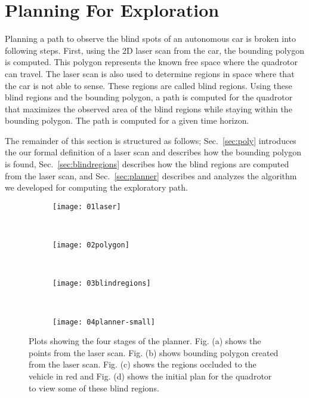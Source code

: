 
\section{Planning For Exploration}

Planning a path to observe the blind spots of an autonomous car is broken into
following steps. First, using the 2D laser scan from the car, the bounding
polygon is computed. This polygon represents the known free space where the
quadrotor can travel. The laser scan is also used to determine regions in space
where that the car is not able to sense. These regions are called blind
regions. Using these blind regions and the bounding polygon, a path is computed
for the quadrotor that maximizes the observed area of the blind regions while
staying within the bounding polygon. The path is computed for a given time
horizon.

The remainder of this section is structured as follows; Sec.~\ref{sec:poly}
introduces the our formal definition of a laser scan and describes how the
bounding polygon is found, Sec.~\ref{sec:blindregions} describes how the blind
regions are computed from the laser scan, and Sec.~\ref{sec:planner} describes
and analyzes the algorithm we developed for computing the exploratory path.

\begin{figure}[ht]

    \centering

    \begin{subfigure}[t]{0.44\textwidth}
        \centering
        \texttt{[image: 01laser]}
        \caption{}
        \label{fig:01laser}
    \end{subfigure}
    ~
    \begin{subfigure}[t]{0.44\textwidth}
        \centering
        \texttt{[image: 02polygon]}
        \caption{}
        \label{fig:02polygon}
    \end{subfigure}
    ~
    \begin{subfigure}[t]{0.44\textwidth}
        \centering
        \texttt{[image: 03blindregions]}
        \caption{}
        \label{fig:03blindregions}
    \end{subfigure}
    ~
    \begin{subfigure}[t]{0.44\textwidth}
        \centering
        \texttt{[image: 04planner-small]}
        \caption{}
        \label{fig:04planner-small}
    \end{subfigure}

    \caption{Plots showing the four stages of the planner. Fig. (a) shows the
    points from the laser scan. Fig. (b) shows bounding polygon created from
the laser scan. Fig. (c) shows the regions occluded to the vehicle in red and
Fig. (d) shows the initial plan for the quadrotor to view some of these blind
regions.}

    \label{fig:planner-stages}

\end{figure}

